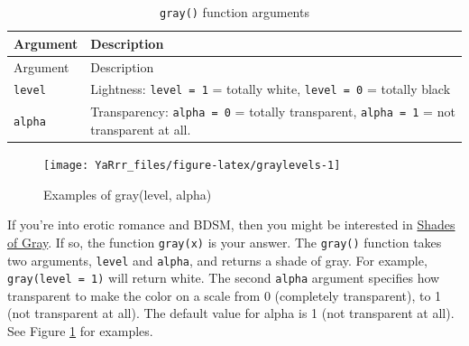 \documentclass[]{book}
\theoremstyle{definition}
\theoremstyle{definition}
\theoremstyle{remark}
\begin{document}
\begin{longtable}[]{@{}ll@{}}
\caption{\label{tab:gray} \texttt{gray()} function arguments}\tabularnewline
\toprule
\begin{minipage}[b]{0.18\columnwidth}\raggedright\strut
Argument\strut
\end{minipage} & \begin{minipage}[b]{0.67\columnwidth}\raggedright\strut
Description\strut
\end{minipage}\tabularnewline
\midrule
\endfirsthead
\toprule
\begin{minipage}[b]{0.18\columnwidth}\raggedright\strut
Argument\strut
\end{minipage} & \begin{minipage}[b]{0.67\columnwidth}\raggedright\strut
Description\strut
\end{minipage}\tabularnewline
\midrule
\endhead
\begin{minipage}[t]{0.18\columnwidth}\raggedright\strut
\texttt{level}\strut
\end{minipage} & \begin{minipage}[t]{0.67\columnwidth}\raggedright\strut
Lightness: \texttt{level\ =\ 1} = totally white, \texttt{level\ =\ 0} =
totally black\strut
\end{minipage}\tabularnewline
\begin{minipage}[t]{0.18\columnwidth}\raggedright\strut
\texttt{alpha}\strut
\end{minipage} & \begin{minipage}[t]{0.67\columnwidth}\raggedright\strut
Transparency: \texttt{alpha\ =\ 0} = totally transparent,
\texttt{alpha\ =\ 1} = not transparent at all.\strut
\end{minipage}\tabularnewline
\bottomrule
\end{longtable}

\begin{figure}

{\centering \texttt{[image: YaRrr\_files/figure-latex/graylevels-1]} 

}

\caption{Examples of gray(level, alpha)}\label{fig:graylevels}
\end{figure}

If you're into erotic romance and BDSM, then you might be interested in
\href{https://en.wikipedia.org/wiki/Fifty_Shades_of_Grey}{Shades of
Gray}. If so, the function \texttt{gray(x)} is your answer. The
\texttt{gray()} function takes two arguments, \texttt{level} and
\texttt{alpha}, and returns a shade of gray. For example,
\texttt{gray(level\ =\ 1)} will return white. The second \texttt{alpha}
argument specifies how transparent to make the color on a scale from 0
(completely transparent), to 1 (not transparent at all). The default
value for alpha is 1 (not transparent at all). See Figure
\ref{fig:graylevels} for examples.
\end{document}
